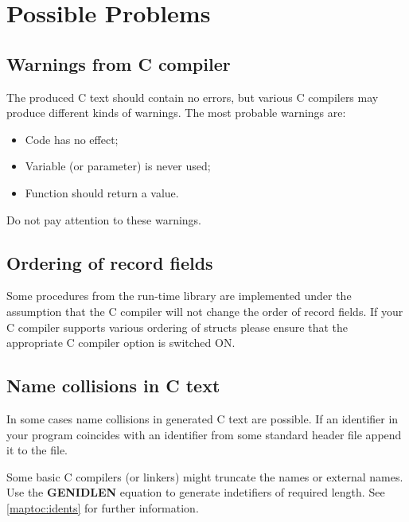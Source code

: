 \ifgenc
\chapter{Possible Problems}\label{problems}

\section{Warnings from C compiler}

The produced C text should contain no errors,
but various C compilers may produce different kinds of warnings.
The most probable warnings are:
\begin{itemize}
\item
Code has no effect;
\item
Variable (or parameter) is never used;
\item
Function should return a value.
\end{itemize}
Do not pay attention to these warnings.

\section{Ordering of record fields}

Some procedures from the run-time library are implemented
under the assumption that the C compiler will not change the
order of record fields. If your C compiler supports various
ordering of structs please ensure that the appropriate
C compiler option is switched ON.

\section{Name collisions in C text}

In some cases name collisions in generated C text are possible.
If an identifier in your program coincides with an identifier
from some standard header file append it to the {\bf\kwd{}} file.

Some basic C compilers (or linkers) might truncate the names
or external names. Use the {\bf GENIDLEN} equation to generate
indetifiers of required length. See \ref{maptoc:idents}
for further information.

\fi %

